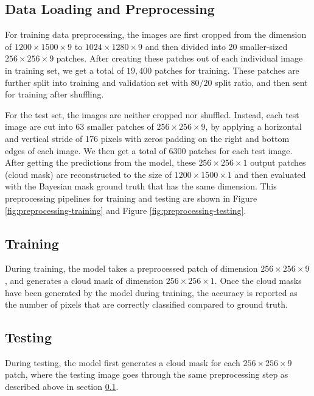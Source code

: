 \documentclass[sigplan,screen]{acmart}
\begin{document}
\subsection{Data Loading and Preprocessing} \label{Preprocessing}

For training data preprocessing, the images are first cropped from the dimension of $1200 \times 1500 \times 9$ to $1024 \times 1280 \times 9$ and then divided into 20 smaller-sized $256 \times 256 \times 9$ patches. After creating these patches out of each individual image in training set, we get a total of $19,400$ patches for training. These patches are further split into training and validation set with $80/20$ split ratio, and then sent for training after shuffling. 

For the test set, the images are neither cropped nor shuffled. Instead, each test image are cut into 63 smaller patches of $256 \times 256 \times 9$, by applying a horizontal and vertical stride of 176 pixels with zeros padding on the right and bottom edges of each image. We then get a total of $6300$ patches for each test image. After getting the predictions from the model, these $256 \times 256 \times 1$ output patches (cloud mask) are reconstructed to the size of $1200 \times 1500 \times 1$ and then evaluated with the Bayesian mask ground truth that has the same dimension. This preprocessing pipelines for training and testing are shown in Figure \ref{fig:preprocessing-training} and Figure \ref{fig:preprocessing-testing}.

\subsection{Training}

During training, the model takes a preprocessed patch of dimension $256 \times 256 \times 9$, and generates a cloud mask of dimension $256 \times 256 \times 1$. Once the cloud masks have been generated by the model during training, the accuracy is reported as the number of pixels that are correctly classified compared to ground truth. 

\subsection{Testing}

During testing, the model first generates a cloud mask for each $256 \times 256 \times 9$ patch, where the testing image goes through the same preprocessing step as described above in section \ref{Preprocessing}. 
\end{document}
